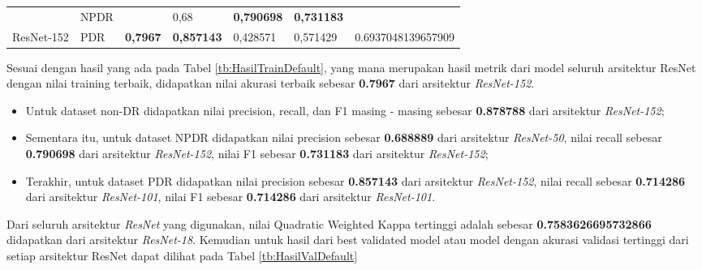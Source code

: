 \begin{table}[hbtp]
\begin{center}
\begin{tabular}{|c|l|c|l|l|l|c|}
			& NPDR                                               &                          & 0,68                                              & \textbf{0,790698}                                         & \textbf{0,731183}                                        &                                      \\ \cline{2-2} \cline{4-6}
			\multirow{-3}{*}{ResNet-152} & PDR                                                & \multirow{-3}{*}{\textbf{0,7967}} & \textbf{0,857143}                                          & 0,428571                                         & 0,571429                                        & \multirow{-3}{*}{0.6937048139657909} \\ \hline
		\end{tabular}
	\end{center}
\end{table}

Sesuai dengan hasil yang ada pada Tabel \ref{tb:HasilTrainDefault}, yang mana merupakan hasil metrik dari model seluruh arsitektur ResNet dengan nilai training terbaik, didapatkan nilai akurasi terbaik sebesar \textbf{0.7967} dari arsitektur \emph{ResNet-152}.

\begin{itemize}

\item Untuk dataset non-DR didapatkan nilai precision, recall, dan F1 masing - masing sebesar \textbf{0.878788} dari arsitektur \emph{ResNet-152};

\item Sementara itu, untuk dataset NPDR didapatkan nilai precision sebesar \textbf{0.688889} dari arsitektur \emph{ResNet-50}, nilai recall sebesar \textbf{0.790698} dari arsitektur \emph{ResNet-152}, nilai F1 sebesar \textbf{0.731183} dari arsitektur \emph{ResNet-152};

\item Terakhir, untuk dataset PDR didapatkan nilai precision sebesar \textbf{0.857143} dari arsitektur \emph{ResNet-152}, nilai recall sebesar \textbf{0.714286} dari arsitektur \emph{ResNet-101}, nilai F1 sebesar \textbf{0.714286} dari arsitektur \emph{ResNet-101}.

\end{itemize}

Dari seluruh arsitektur \emph{ResNet} yang digunakan, nilai Quadratic Weighted Kappa tertinggi adalah sebesar \textbf{0.7583626695732866} didapatkan dari arsitektur \emph{ResNet-18}. Kemudian untuk hasil dari best validated model atau model dengan akurasi validasi tertinggi dari setiap arsitektur ResNet dapat dilihat pada Tabel \ref{tb:HasilValDefault}

